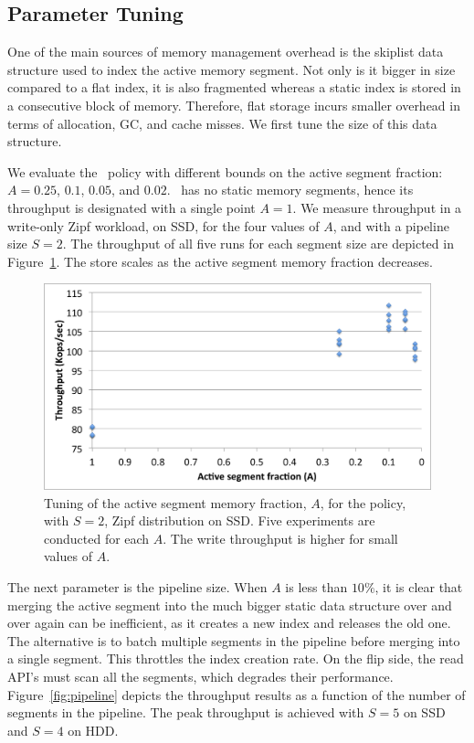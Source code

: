 \subsection{Parameter Tuning} \label{ssec:tuning}
One of the main sources of memory management overhead is the skiplist data structure used to index the active  memory segment.
Not only  is it bigger in size compared to a flat index, it is also fragmented whereas a static index is stored in a consecutive block of memory. Therefore, flat storage incurs smaller overhead in terms of allocation, GC, and cache misses.
We first tune the size of this data structure.

We evaluate the \basic\ policy with different bounds on the active segment fraction: $A=0.25$, $0.1$, $0.05$, and $0.02$. 
\none\ has no static memory segments, hence its throughput is designated with a single point  $A=1$.
We measure  throughput in a write-only Zipf workload, on SSD,  for the four values of $A$, and with a pipeline size $S=2$.
The throughput of all five runs for each segment size are depicted in  Figure~\ref{fig:dynamic-fraction}. 
The store scales as the active segment memory fraction decreases. 

\begin{figure}[htb]
\includegraphics[width=\figw]{Figs/dynamic-fraction-1.png}
\caption{Tuning of the active segment memory fraction, $A$, for the \basic\/ policy, with $S=2$,
Zipf distribution on SSD.  Five experiments are conducted for each $A$. 
The write throughput is higher for small values of $A$.
}
\label{fig:dynamic-fraction}
\end{figure}

The next parameter is the pipeline size.
When $A$ is less than $10\%$, it is clear that merging the active segment into the much bigger static data structure
over and over again can be inefficient, as it creates a new index and releases the old one. 
The alternative is to batch multiple segments in the pipeline before merging into a single segment. 
This throttles the index creation rate. On the flip side, the read API's must scan all the segments, 
which degrades their performance.
Figure~\ref{fig:pipeline} depicts the throughput results as a function of the number of segments in the pipeline. 
The peak throughput is achieved with $S=5$ on SSD and $S=4$ on HDD.

